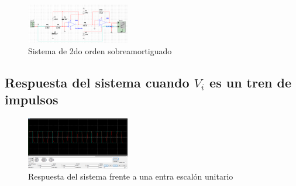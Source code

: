 \documentclass[conference]{IEEEtran}
\begin{document}
	\begin{figure}[h]
		\centering
		\includegraphics[width=0.4\textwidth]{media/sistema-sobreamortiguado}
		\caption{Sistema de 2do orden sobreamortiguado}
		\label{fig:sistema-sobreamortiguado}
	\end{figure}
	
	\subsection{Respuesta del sistema cuando $V_i$ es un tren de impulsos}
	
	\begin{figure}[h]
		\centering
		\includegraphics[width=0.4\textwidth]{media/sobre-tren-impulsos}
		\caption{Respuesta del sistema frente a una entra escalón unitario}
		\label{fig:sobre-tren-impulsos}
	\end{figure}
	
	
	
\end{document}
